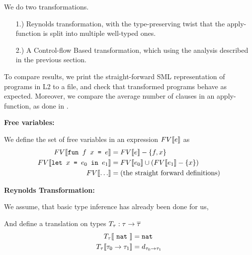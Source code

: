 We do two transformations.
\begin{enumerate}
  \item[1.)] Reynolds transformation, with the type-preserving twist that the
    apply-function is split into multiple well-typed ones.
  \item[2.)] A Control-flow Based transformation, which using the analysis
    described in the previous section.
\end{enumerate}
To compare results, we print the straight-forward SML representation of
programs in L2 to a file, and check that transformed programs behave as expected.
Moreover, we compare the average number of clauses in an apply-function,
as done in \cite{cfa0-mlton}.

{\bf Free variables:}

We define the set of free variables in an expression $FV\llbracket e\rrbracket$ as
\begin{align*}
  FV\llbracket\text{\tt fun $f$ $x$ = $e$}\rrbracket &= FV\llbracket e\rrbracket - \{f, x\}\\
  FV\llbracket\text{\tt let $x$ = $e_0$ in $e_1$}\rrbracket &= FV\llbracket e_0\rrbracket \cup (FV\llbracket e_1\rrbracket - \{x\})\\
  FV\llbracket\dots\rrbracket &= (\text{the straight forward definitions})
\end{align*}

{\bf Reynolds Transformation:}

We assume, that basic type inference has already been done for us,

And define a translation on types $T_\tau : \tau\rightarrow \overline\tau$
\begin{align*}
  T_\tau\llbracket\ \text{\tt nat}\ \rrbracket &= \text{\tt nat}\\
  T_\tau\llbracket\tau_0 \rightarrow \tau_1\rrbracket &= d_{\tau_0 \rightarrow \tau_1}
\end{align*}

